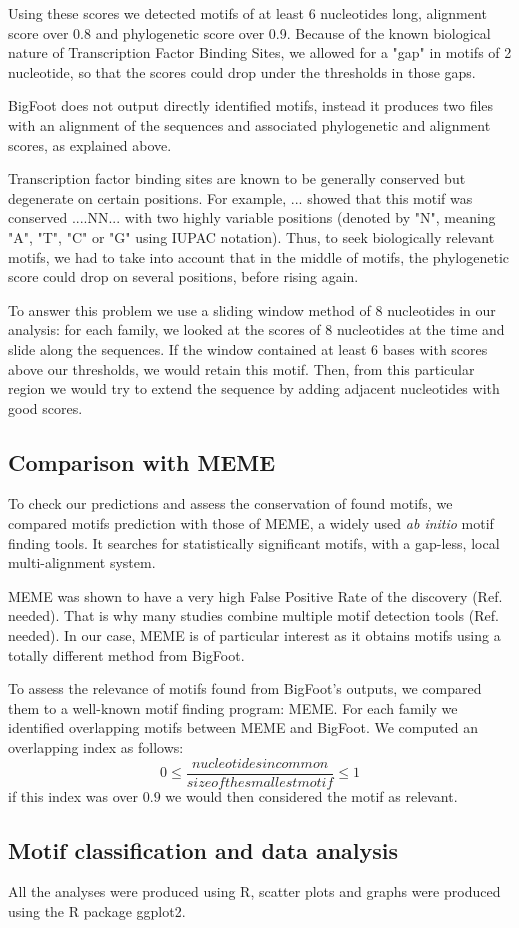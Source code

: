 Using these scores we detected motifs of at least 6 nucleotides long, alignment score over 0.8 and phylogenetic score over 0.9. Because of the known biological nature of Transcription Factor Binding Sites, we allowed for a "gap" in motifs of 2 nucleotide, so that the scores could drop under the thresholds in those gaps.

BigFoot does not output directly identified motifs, instead it produces two files with an alignment of the sequences and associated phylogenetic and alignment scores, as explained above.

Transcription factor binding sites are known to be generally conserved but degenerate on certain positions. For example, ... showed that this motif was conserved ....NN... with two highly variable positions (denoted by "N", meaning "A", "T", "C" or "G" using IUPAC notation). Thus, to seek biologically relevant motifs, we had to take into account that in the middle of motifs, the phylogenetic score could drop on several positions, before rising again.

To answer this problem we use a sliding window method of 8 nucleotides in our analysis: for each family, we looked at the scores of 8 nucleotides at the time and slide along the sequences. If the window contained at least 6 bases with scores above our thresholds, we would retain this motif. Then, from this particular region we would try to extend the sequence by adding adjacent nucleotides with good scores.

\subsection*{Comparison with MEME}

To check our predictions and assess the conservation of found motifs, we compared motifs prediction with those of MEME, a widely used \textit{ab initio} motif finding tools. It searches for statistically significant motifs, with a gap-less, local multi-alignment system.

MEME was shown to have a very high False Positive Rate of the discovery (Ref. needed). That is why many studies combine multiple motif detection tools (Ref. needed). In our case, MEME is of particular interest as it obtains motifs using a totally different method from BigFoot.

To assess the relevance of motifs found from BigFoot's outputs, we compared them to a well-known motif finding program: MEME. For each family we identified overlapping motifs between MEME and BigFoot. We computed an overlapping index as follows: 
\begin{equation}
0 \leq \frac{nucleotides in common}{size of the smallest motif} \leq 1
\end{equation}
if this index was over $0.9$ we would then considered the motif as relevant.

\subsection*{Motif classification and data analysis}

All the analyses were produced using R, scatter plots and graphs were produced using the R package ggplot2.

